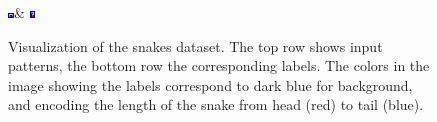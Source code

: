 \begin{figure}
\begin{tabu}
    \includegraphics[width=\linewidth]{evaluation/images/snake_label_0006}&%
    \includegraphics[width=\linewidth]{evaluation/images/snake_label_0007}
    \end{tabu}
\caption{%
    Visualization of the snakes dataset. The top row shows input patterns, the bottom row the corresponding
    labels. The colors in the image showing the labels correspond to dark blue for background, and encoding
    the length of the snake from head (red) to tail (blue).
}
\end{figure}

